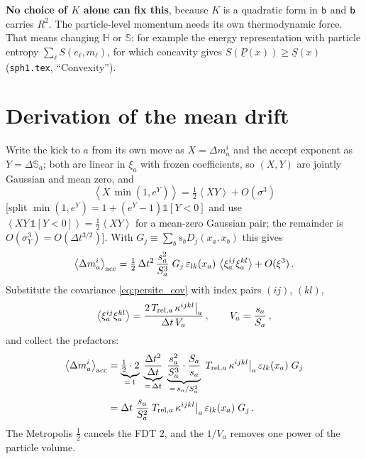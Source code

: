 \documentclass[12pt,aps,preprint,nofootinbib,noshowkeys,noshowpacs,longbibliography,superscriptaddress,tightenlines]{revtex4-2}
\def\Sbb{{\mathbb S}}
\def\bbeta{{\sf b}}
\def\llangle{\left\langle}
\def\rrangle{\right\rangle}
\newcommand{\nn}{\nonumber}
\def\st{\begin{equation}}
\def\stp{\end{equation}}
\begin{document}
\textbf{No choice of $K$ alone can fix this}, because $K$ is a quadratic form in
$\bbeta$ and $\bbeta$ carries $R^2$.  The particle-level momentum needs its own
thermodynamic force.  That means changing $\mathbb H$ or $\Sbb$: for example
the energy representation with particle entropy $\sum_\ell S(e_\ell,m_\ell)$,
for which concavity gives $S(\underline P(x))\ge\underline S(x)$
(\texttt{sph1.tex}, ``Convexity'').

\appendix

\section{Derivation of the mean drift}
\label{app:drift}

Write the kick to $a$ from its own move as $X=\Delta m_a^i$ and the
accept exponent as $Y=\Delta\Sbb_a$; both are linear in $\xi_a$ with frozen
coefficients, so $(X,Y)$ are jointly Gaussian and mean zero, and
\st
\llangle X\,\min(1,e^{Y})\rrangle
   = \tfrac12\llangle XY\rrangle + O(\sigma^3)
\stp
[split $\min(1,e^Y) = 1 + (e^Y-1)\mathds{1}[Y<0]$ and use
$\llangle XY\,\mathds{1}[Y<0]\rrangle = \tfrac12\llangle XY\rrangle$ for a
mean-zero Gaussian pair; the remainder is $O(\sigma_Y^3)=O(\Delta t^{3/2})$].
With $G_j\equiv\sum_b s_b D_j(x_a,x_b)$ this gives
\st
\label{eq:drift_raw}
\big\langle\Delta m_a^i\big\rangle_{\rm acc}
   = \tfrac12\,\Delta t^2\,\frac{s_a^2}{S_a^{3}}\;
     G_j\,\varepsilon_{lk}(x_a)\,\llangle\xi_a^{ij}\xi_a^{kl}\rrangle
   + O(\xi^3)\,.
\stp
Substitute the covariance \eqref{eq:persite_cov} with index pairs $(ij)$,
$(kl)$,
\st
\llangle\xi_a^{ij}\xi_a^{kl}\rrangle
   = \frac{2\,T_{{\rm rel},a}\,\kappa^{ijkl}\big|_a}{\Delta t\,V_a}\,,
\qquad V_a=\frac{s_a}{S_a}\,,
\stp
and collect the prefactors:
\begin{align}
\big\langle\Delta m_a^i\big\rangle_{\rm acc}
  &= \underbrace{\tfrac12\cdot 2}_{=\,1}\;
     \underbrace{\frac{\Delta t^{2}}{\Delta t}}_{=\,\Delta t}\;
     \underbrace{\frac{s_a^{2}}{S_a^{3}}\cdot\frac{S_a}{s_a}}_{=\,s_a/S_a^{2}}\;
     T_{{\rm rel},a}\,\kappa^{ijkl}\big|_a\,\varepsilon_{lk}(x_a)\;G_j \nn\\[2pt]
  &= \Delta t\;\frac{s_a}{S_a^{2}}\;
     T_{{\rm rel},a}\,\kappa^{ijkl}\big|_a\,\varepsilon_{lk}(x_a)\;G_j\,.
\label{eq:drift_mid}
\end{align}
The Metropolis $\tfrac12$ cancels the FDT $2$, and the $1/V_a$ removes one
power of the particle volume.
\end{document}

